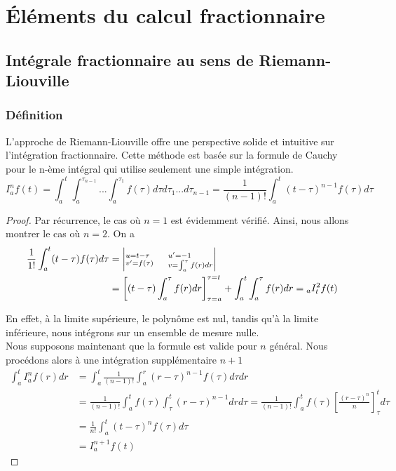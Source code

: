 

\chapter{Éléments du calcul fractionnaire}
\label{chap:Dérivées et Intégrales d'ordre non entier}
\pagestyle{fancy}
\section{Intégrale fractionnaire au sens de Riemann-Liouville} 
\subsection{Définition}
L'approche de Riemann-Liouville offre une perspective solide et intuitive sur l'intégration fractionnaire. Cette méthode est basée sur la formule de Cauchy pour le n-ème intégral qui utilise seulement une simple intégration.
\begin{equation} \label{eq:int_succ}
    I_{a}^{n} f(t) = \int_{a}^{t} \int_{a}^{\tau_{n-1}} ... \int_{a}^{\tau_1} f(\tau) d\tau d\tau_1 ... d\tau_{n-1} = \frac{1}{(n-1)!}\int_{a}^{t} (t-\tau)^{n-1} f(\tau)d\tau
\end{equation}
\begin{proof}
    Par récurrence, le cas où $ n= 1$ est évidemment vérifié. Ainsi, nous allons montrer le cas où $n=2$.
    On a 
    \begin{align*}
    \frac{1}{1!} \int_{a}^{t} (t - \tau) f(\tau) d\tau &= \left|^{u = t-\tau}_{v'= f(\tau)} \hspace{0.5cm} {_{v = \int_{a}^{\tau} f(r) dr} ^{u'=-1}}\right| \\
    &= \left[(t-\tau)\int_{a}^{\tau}f(r)dr \right]_{\tau=a}^{\tau=t} + \int_{a}^{t}\int_{a}^{\tau}f(r)dr = {}_{a}I_t^2 f(t)
    \end{align*}
    
    En effet, à la limite supérieure, le polynôme est nul, tandis qu'à la limite inférieure, nous intégrons sur un ensemble de mesure nulle.\\
    Nous supposons maintenant que la formule est valide pour $n$ général. Nous procédons alors à une intégration supplémentaire $n+1$
    \begin{align*}
        \int_{a}^{t} I_{a}^{n} f(r)dr &= \int_{a}^{t}  \frac{1}{(n-1)!} \int_{a}^{r} (r - \tau)^{n-1} f(\tau) d\tau dr \\
        &= \frac{1}{(n-1)!} \int_{a}^{t}f(\tau)\int_{\tau}^{t} (r - \tau)^{n-1} drd\tau
        = \frac{1}{(n-1)!} \int_{a}^{t}f(\tau) \left[ \frac{(r-\tau)^n}{n} \right]_\tau ^t d\tau \\
        &= \frac{1}{n!} \int_{a}^{t} (t-\tau)^n f(\tau) d\tau \\
        &= I_a^{n+1} f(t)
    \end{align*}
\end{proof}
